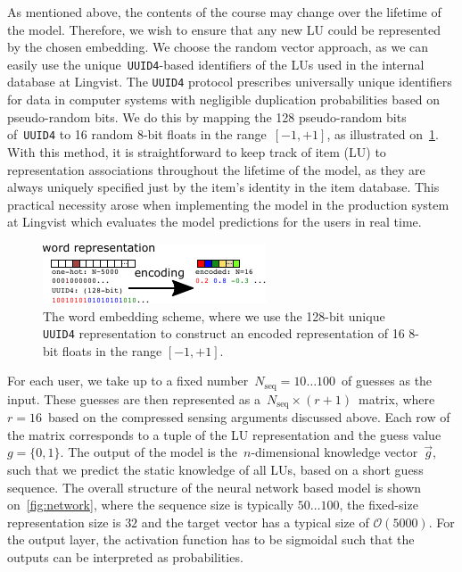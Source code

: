 As mentioned above, the contents of the course may change over the lifetime of the model. Therefore, we wish to ensure that any new LU could be represented by the chosen embedding. We choose the random vector approach, as we can easily use the unique~\texttt{UUID4}-based identifiers of the LUs used in the internal database at Lingvist. The \texttt{UUID4} protocol prescribes universally unique identifiers for data in computer systems with negligible duplication probabilities based on pseudo-random bits. We do this by mapping the 128 pseudo-random bits of~\texttt{UUID4} to 16 random 8-bit floats in the range~$[-1, +1]$, as illustrated on~\cref{fig:embedding}. With this method, it is straightforward to keep track of item (LU) to representation associations throughout the lifetime of the model, as they are always uniquely specified just by the item's identity in the item database. This practical necessity arose when implementing the model in the production system at Lingvist which evaluates the model predictions for the users in real time.

\begin{figure}[ht]
\centering
\includegraphics[width=0.7\linewidth]{figures/lingvist/embedding.pdf}
\caption[The word embedding scheme]{The word embedding scheme, where we use the 128-bit unique \texttt{UUID4} representation to construct an encoded representation of 16 8-bit floats in the range $[-1, +1]$.} 
\label{fig:embedding} 
\end{figure} 

For each user, we take up to a fixed number~$N_{\mathrm{seq}} = 10\dots100$~of guesses as the input. These guesses are then represented as a~$N_{\mathrm{seq}} \times (r + 1)$~matrix, where~$r=16$~based on the compressed sensing arguments discussed above. Each row of the matrix corresponds to a tuple of the LU representation and the guess value~$g=\{0,1\}$. The output of the model is the~$n$-dimensional knowledge vector~$\vec{g}$, such that we predict the static knowledge of all LUs, based on a short guess sequence. The overall structure of the neural network based model is shown on~\cref{fig:network}, where the sequence size is typically $50\dots 100$, the fixed-size representation size is $32$ and the target vector has a typical size of $\mathcal{O}(5000)$. For the output layer, the activation function has to be sigmoidal such that the outputs can be interpreted as probabilities.

